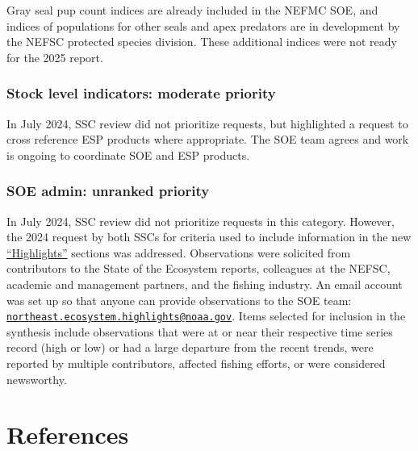 \documentclass[
  10pt,
]{article}
\begin{document}
Gray seal pup count indices are already included in the NEFMC SOE, and
indices of populations for other seals and apex predators are in
development by the NEFSC protected species division. These additional
indices were not ready for the 2025 report.

\hypertarget{stock-level-indicators-moderate-priority}{%
\subsubsection{Stock level indicators: moderate
priority}\label{stock-level-indicators-moderate-priority}}

In July 2024, SSC review did not prioritize requests, but highlighted a
request to cross reference ESP products where appropriate. The SOE team
agrees and work is ongoing to coordinate SOE and ESP products.

\hypertarget{soe-admin-unranked-priority}{%
\subsubsection{SOE admin: unranked
priority}\label{soe-admin-unranked-priority}}

In July 2024, SSC review did not prioritize requests in this category.
However, the 2024 request by both SSCs for criteria used to include
information in the new
\href{https://noaa-edab.github.io/catalog/observation_synthesis_2024.html}{``Highlights''}
sections was addressed. Observations were solicited from contributors to
the State of the Ecosystem reports, colleagues at the NEFSC, academic
and management partners, and the fishing industry. An email account was
set up so that anyone can provide observations to the SOE team:
\href{mailto:northeast.ecosystem.highlights@noaa.gov}{\nolinkurl{northeast.ecosystem.highlights@noaa.gov}}.
Items selected for inclusion in the synthesis include observations that
were at or near their respective time series record (high or low) or had
a large departure from the recent trends, were reported by multiple
contributors, affected fishing efforts, or were considered newsworthy.

\newpage

\hypertarget{references}{%
\section*{References}\label{references}}
\end{document}
